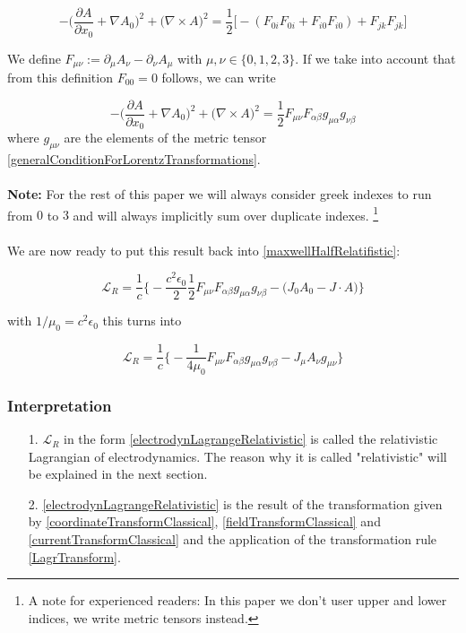 \documentclass{article}
\begin{document}
\begin{equation}
    -\bigg(\frac{\partial A}{\partial x_0} + \nabla A_0 \bigg)^2 + \bigg(\nabla \times A\bigg)^2
    = \frac{1}{2} \bigg[ -(F_{0i} F_{0i} + F_{i0} F_{i0}) + F_{jk} F_{jk}\bigg]
\end{equation}


We define $F_{\mu\nu} := \partial_\mu A_\nu - \partial_\nu A_\mu$ with $\mu, \nu \in \{0,1,2,3\}$.
If we take into account that from this definition $F_{00} = 0$ follows, we can write

\begin{equation}
-\bigg(\frac{\partial A}{\partial x_0} + \nabla A_0 \bigg)^2 + \bigg(\nabla \times A\bigg)^2
= \frac{1}{2} F_{\mu\nu}F_{\alpha\beta} g_{\mu\alpha} g_{\nu\beta}
\end{equation}
where $g_{\mu\nu}$ are the elements of the metric tensor \ref{generalConditionForLorentzTransformations}.
\\
\\
\noindent
\textbf{Note:} For the rest of this paper we will always consider greek indexes to run from $0$ to $3$ and will always implicitly sum over duplicate indexes.
\footnote{A note for experienced readers: In this paper we don't user upper and lower indices, we write metric tensors instead.}
\\
\\
\noindent
We are now ready to put this result back into \ref{maxwellHalfRelatifistic}:

\begin{equation}
    \mathcal{L}_R = \frac{1}{c} \bigg\{ - \frac{c^2 \epsilon_0}{2} \frac{1}{2} F_{\mu\nu}F_{\alpha\beta} g_{\mu\alpha} g_{\nu\beta} - \big( J_0 A_0 - J \cdot A \big) \bigg\}
\end{equation}

with $1/\mu_0=c^2 \epsilon_0 $ this turns into

\begin{equation} \label{electrodynLagrangeRelativistic}
    \mathcal{L}_R = \frac{1}{c} \bigg\{ - \frac{1}{4 \mu_0} F_{\mu\nu}F_{\alpha\beta} g_{\mu\alpha} g_{\nu\beta} - J_\mu A_\nu g_{\mu\nu} \bigg\}
\end{equation}

\subsubsection{Interpretation}
\begin{itemize}
    \item[1.] $\mathcal{L}_R$ in the form \ref{electrodynLagrangeRelativistic} is called the relativistic Lagrangian of electrodynamics.
              The reason why it is called "relativistic" will be explained in the next section.
    \item[2.] \ref{electrodynLagrangeRelativistic} is the result of the transformation given by \ref{coordinateTransformClassical},
              \ref{fieldTransformClassical} and \ref{currentTransformClassical} and the application of the transformation rule \ref{LagrTransform}.
\end{itemize}
\end{document}
